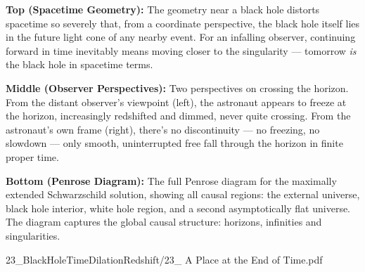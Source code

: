 \begin{SideNotePage}{
  \textbf{Top (Spacetime Geometry):} The geometry near a black hole distorts spacetime so severely that, from a coordinate perspective, the black hole itself lies in the future light cone of any nearby event. For an infalling observer, continuing forward in time inevitably means moving closer to the singularity — tomorrow \textit{is} the black hole in spacetime terms. \par
  \textbf{Middle (Observer Perspectives):} Two perspectives on crossing the horizon. From the distant observer’s viewpoint (left), the astronaut appears to freeze at the horizon, increasingly redshifted and dimmed, never quite crossing. From the astronaut’s own frame (right), there’s no discontinuity — no freezing, no slowdown — only smooth, uninterrupted free fall through the horizon in finite proper time. \par
  \textbf{Bottom (Penrose Diagram):} The full Penrose diagram for the maximally extended Schwarzschild solution, showing all causal regions: the external universe, black hole interior, white hole region, and a second asymptotically flat universe. The diagram captures the global causal structure: horizons, infinities and singularities.
}{23_BlackHoleTimeDilationRedshift/23_ A Place at the End of Time.pdf}
\end{SideNotePage}
